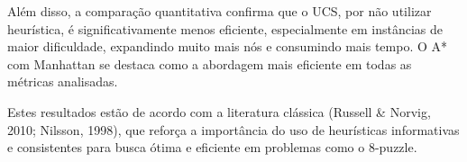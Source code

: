 Além disso, a comparação quantitativa confirma que o UCS, por não utilizar heurística, é significativamente menos eficiente, especialmente em instâncias de maior dificuldade, expandindo muito mais nós e consumindo mais tempo. O A* com Manhattan se destaca como a abordagem mais eficiente em todas as métricas analisadas.  
  
Estes resultados estão de acordo com a literatura clássica (Russell \& Norvig, 2010; Nilsson, 1998), que reforça a importância do uso de heurísticas informativas e consistentes para busca ótima e eficiente em problemas como o 8-puzzle.  
  